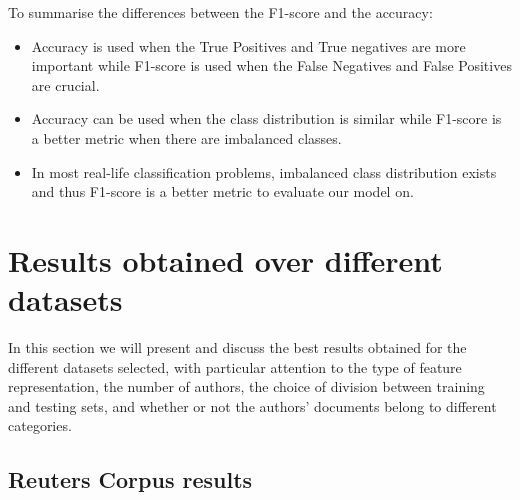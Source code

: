 To summarise the differences between the F1-score and the accuracy:
\begin{itemize}
	\item Accuracy is used when the True Positives and True negatives are more important while F1-score is used when the False Negatives and False Positives are crucial.
	\item Accuracy can be used when the class distribution is similar while F1-score is a better metric when there are imbalanced classes.
	\item In most real-life classification problems, imbalanced class distribution exists and thus F1-score is a better metric to evaluate our model on.
\end{itemize}

\section{Results obtained over different datasets}

In this section we will present and discuss the best results obtained for the different datasets selected, with particular attention to the type of feature representation, the number of authors, the choice of division between training and testing sets, and whether or not the authors' documents belong to different categories.

\subsection{Reuters Corpus results}

